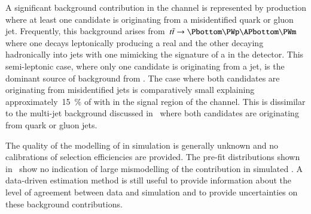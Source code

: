 

A significant background contribution in the \hadhad channel is
represented by \ttbar production where at least one \tauhadvis
candidate is originating from a misidentified quark or gluon
jet. Frequently, this background arises
from~$\ttbar \ra \Pbottom \PWp \APbottom \PWm$ where one \PW decays
leptonically producing a real \tauhad and the other decaying
hadronically into jets with one mimicking the signature of a
\tauhadvis in the detector. This semi-leptonic case, where only one
\tauhadvis candidate is originating from a jet, is the dominant source
of \faketauhadvis background from \ttbar. The case where both
\tauhadvis candidates are originating from misidentified jets is
comparatively small explaining approximately~\SI{15}{\percent} of
\ttbar with \faketauhadvis in the signal region of the \hadhad
channel. This is dissimilar to the multi-jet background discussed
in~ where both \tauhadvis candidates are
originating from quark or gluon jets.

The quality of the modelling of \faketauhadvis in simulation is
generally unknown and no calibrations of selection efficiencies are
provided. The pre-fit distributions shown
in~ show no indication of large
mismodelling of the \faketauhadvis contribution in simulated \ttbar. A
data-driven estimation method is still useful to provide information
about the level of agreement between data and simulation and to
provide uncertainties on these background contributions.

